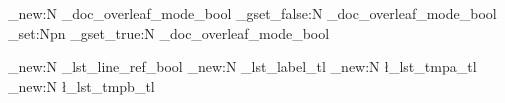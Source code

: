 
\usepackage[english]{babel}
\usepackage{metalogo}
\usepackage{tcolorbox}
\usepackage{booktabs}
\usepackage{microtype}
\usepackage{expl3}
\usepackage{mdframed}
\usepackage{chngcntr}
\usepackage{etoolbox}
\usepackage{adjustbox}
\usepackage{supertabular}
\usepackage{makecell}
\usepackage{tikz}
\usepackage{ragged2e}
\usepackage{float}
\usepackage{array}
\usepackage{xcolor}
\usepackage{datetime2}
\usepackage{listings}
\usepackage{xsimverb}
\usepackage[scale=0.9]{tgheros}
\usepackage{DejaVuSansMono}

\ExplSyntaxOn

\bool_new:N \g_doc_overleaf_mode_bool
\bool_gset_false:N \g_doc_overleaf_mode_bool
\cs_set:Npn \UseOverleafMode
{
    \bool_gset_true:N \g_doc_overleaf_mode_bool
}
\ExplSyntaxOff


\usepackage[breaklinks]{hyperref}
\usepackage[capitalise]{cleveref}



\newcommand*{\LT}{\texorpdfstring{\LaTeX}{LaTeX}}
\newcommand*{\LTT}{\texorpdfstring{\LaTeX3}{LaTeX3}}
\let\liii\LTT


\newcommand{\ListOfCodeExampleName}{List of Examples}
\makeatletter
\newcommand{\ListOfCodeExample}{\section*{\ListOfCodeExampleName}\@starttoc{CodeExample}}
\makeatother


\makeatletter
\ExplSyntaxOn
\bool_new:N \g_lst_line_ref_bool
\tl_new:N \g_lst_label_tl
\tl_new:N \l_lst_tmpa_tl
\tl_new:N \l_lst_tmpb_tl

\newcommand{\SetLstRefLabel}[1]{\tl_gset:Nn \g_lst_label_tl {#1}}


